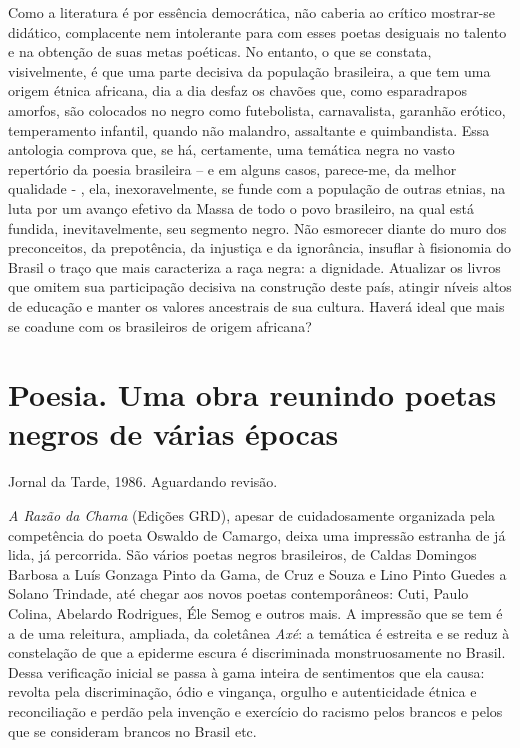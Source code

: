 \documentclass[
  letterpaper,
  DIV=11,
  numbers=noendperiod]{scrreprt}
\begin{document}
Como a literatura é por essência democrática, não caberia ao crítico
mostrar-se didático, complacente nem intolerante para com esses poetas
desiguais no talento e na obtenção de suas metas poéticas. No entanto, o
que se constata, visivelmente, é que uma parte decisiva da população
brasileira, a que tem uma origem étnica africana, dia a dia desfaz os
chavões que, como esparadrapos amorfos, são colocados no negro como
futebolista, carnavalista, garanhão erótico, temperamento infantil,
quando não malandro, assaltante e quimbandista. Essa antologia comprova
que, se há, certamente, uma temática negra no vasto repertório da poesia
brasileira -- e em alguns casos, parece-me, da melhor qualidade - , ela,
inexoravelmente, se funde com a população de outras etnias, na luta por
um avanço efetivo da Massa de todo o povo brasileiro, na qual está
fundida, inevitavelmente, seu segmento negro. Não esmorecer diante do
muro dos preconceitos, da prepotência, da injustiça e da ignorância,
insuflar à fisionomia do Brasil o traço que mais caracteriza a raça
negra: a dignidade. Atualizar os livros que omitem sua participação
decisiva na construção deste país, atingir níveis altos de educação e
manter os valores ancestrais de sua cultura. Haverá ideal que mais se
coadune com os brasileiros de origem africana?

\chapter{Poesia. Uma obra reunindo poetas negros de várias
épocas}\label{poesia.-uma-obra-reunindo-poetas-negros-de-vuxe1rias-uxe9pocas}

Jornal da Tarde, 1986. Aguardando revisão.

\hfill\break

\emph{A Razão da Chama} (Edições GRD), apesar de cuidadosamente
organizada pela competência do poeta Oswaldo de Camargo, deixa uma
impressão estranha de já lida, já percorrida. São vários poetas negros
brasileiros, de Caldas Domingos Barbosa a Luís Gonzaga Pinto da Gama, de
Cruz e Souza e Lino Pinto Guedes a Solano Trindade, até chegar aos novos
poetas contemporâneos: Cuti, Paulo Colina, Abelardo Rodrigues, Éle Semog
e outros mais. A impressão que se tem é a de uma releitura, ampliada, da
coletânea \emph{Axé}: a temática é estreita e se reduz à constelação de
que a epiderme escura é discriminada monstruosamente no Brasil. Dessa
verificação inicial se passa à gama inteira de sentimentos que ela
causa: revolta pela discriminação, ódio e vingança, orgulho e
autenticidade étnica e reconciliação e perdão pela invenção e exercício
do racismo pelos brancos e pelos que se consideram brancos no Brasil
etc.
\end{document}
